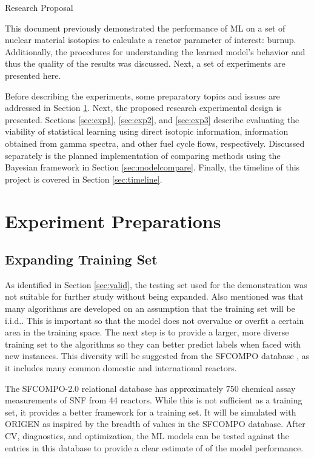 {Research Proposal}
\label{ch:proposal}

This document previously demonstrated the performance of \gls{ML} on a
set of nuclear material isotopics to calculate a reactor parameter of interest:
burnup.  Additionally, the procedures for understanding the learned model's
behavior and thus the quality of the results was discussed.  Next, a set of
experiments are presented here. 

Before describing the experiments, some preparatory topics and issues are
addressed in Section \ref{sec:prep}.  Next, the proposed research experimental
design is presented. Sections \ref{sec:exp1}, \ref{sec:exp2}, and
\ref{sec:exp3} describe evaluating the viability of statistical learning using
direct isotopic information, information obtained from gamma spectra, and other
fuel cycle flows, respectively.  Discussed separately is the planned
implementation of comparing methods using the Bayesian framework in Section
\ref{sec:modelcompare}. Finally, the timeline of this project is covered in
Section \ref{sec:timeline}.

\section{Experiment Preparations}
\label{sec:prep}

\subsection*{Expanding Training Set}

As identified in Section \ref{sec:valid}, the testing set used for the
demonstration was not suitable for further study without being expanded. Also
mentioned was that many algorithms are developed on an assumption that the
training set will be \acrfull{i.i.d.}.  This is important so that the model
does not overvalue or overfit a certain area in the training space.  The next
step is to provide a larger, more diverse training set to the algorithms so
they can better predict labels when faced with new instances. This diversity
will be suggested from the \gls{SFCOMPO} database \cite{sfcompo}, as it
includes many common domestic and international reactors.

The SFCOMPO-2.0 relational database \cite{sfcompo} has approximately 750
chemical assay measurements of \gls{SNF} from 44 reactors. While this is not
sufficient as a training set, it provides a better framework for a training
set. It will be simulated with \gls{ORIGEN} as inspired by the breadth of
values in the \gls{SFCOMPO} database. After \gls{CV}, diagnostics, and
optimization, the \gls{ML} models can be tested against the entries in this
database to provide a clear estimate of of the model performance. 

